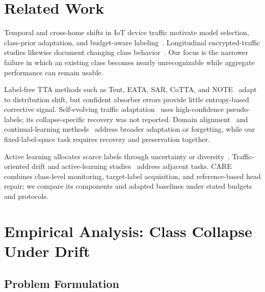 \documentclass[journal]{IEEEtran}
\newcommand{\ours}{CARE}  %
\begin{document}


\section{Related Work}
\label{sec:related}

Temporal and cross-home shifts in IoT device traffic motivate model selection, class-prior adaptation, and budget-aware labeling~\cite{pashamokhtari2023dynamic,azizi2025labelshift,azizi2026budget}. Longitudinal encrypted-traffic studies likewise document changing class behavior~\cite{soukup2025drift,malekghaini2023drift,jerabek2025eval}. Our focus is the narrower failure in which an existing class becomes nearly unrecognizable while aggregate performance can remain usable.

Label-free TTA methods such as Tent, EATA, SAR, CoTTA, and NOTE~\cite{wang2021tent,niu2022eata,niu2023sar,wang2022cotta,gong2022note} adapt to distribution shift, but confident absorber errors provide little entropy-based corrective signal. Self-evolving traffic adaptation~\cite{chen2025selfevolving} uses high-confidence pseudo-labels; its collapse-specific recovery was not reported. Domain alignment~\cite{ganin2016dann,long2018cdan} and continual-learning methods~\cite{cerasuolo2024memento,zhu2023iletc,prime2025} address broader adaptation or forgetting, while our fixed-label-space task requires recovery and preservation together.

Active learning allocates scarce labels through uncertainty or diversity~\cite{settles2009active,sener2018coreset,ash2020badge}. Traffic-oriented drift and active-learning studies~\cite{yang2021cade,micfoal2023,netguard2025} address adjacent tasks. \ours{} combines class-level monitoring, target-label acquisition, and reference-based head repair; we compare its components and adapted baselines under stated budgets and protocols.



\section{Empirical Analysis: Class Collapse Under Drift}
\label{sec:analysis}

\subsection{Problem Formulation}
\label{sec:problem}
\end{document}
